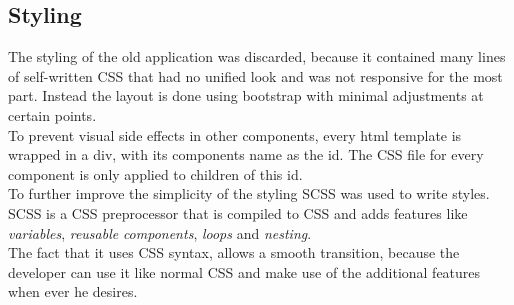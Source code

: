 \subsection{Styling}
\label{sec:styling}
The styling of the old application was discarded, because it contained many lines of self-written CSS that had no unified look and was not responsive for the most part. Instead the layout is done using bootstrap with minimal adjustments at certain points.\\
To prevent visual side effects in other components, every html template is wrapped in a div, with its components name as the id. The CSS file for every component is only applied to children of this id.\\
To further improve the simplicity of the styling SCSS was used to write styles. SCSS is a CSS preprocessor that is compiled to CSS and adds features like \textit{variables}, \textit{reusable} \textit{components}, \textit{loops} and \textit{nesting}.\\
The fact that it uses CSS syntax, allows a smooth transition, because the developer can use it like normal CSS and make use of the additional features when ever he desires.
